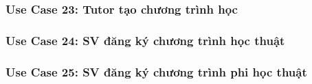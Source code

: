 \newpage
\subsubsection*{Use Case 23: Tutor tạo chương trình học}
\begin{samepage}

\end{samepage}


\newpage
\subsubsection*{Use Case 24: SV đăng ký chương trình học thuật}
\begin{samepage}

\end{samepage}


\newpage
\subsubsection*{Use Case 25: SV đăng ký chương trình phi học thuật}
\begin{samepage}

\end{samepage}


